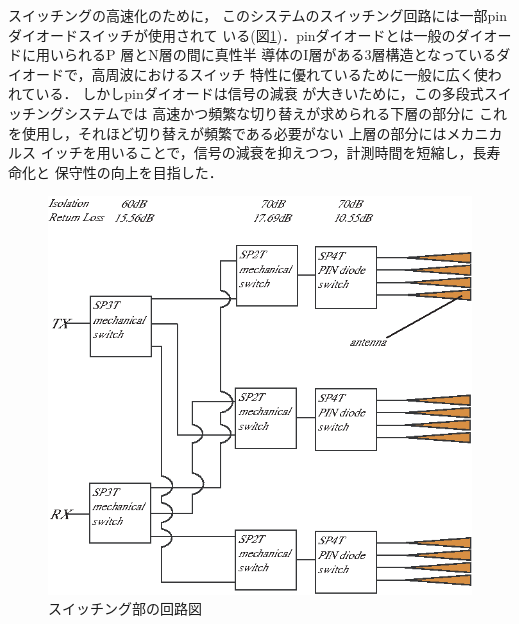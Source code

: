 ﻿\documentclass[12pt,oneside]{jsbook}
\begin{document}
スイッチングの高速化のために，
このシステムのスイッチング回路には一部pinダイオードスイッチが使用されて
いる(図\ref{scircuit})．pinダイオードとは一般のダイオードに用いられるP
層とN層の間に真性半
導体のI層がある3層構造となっているダイオードで，高周波におけるスイッチ
特性に優れているために一般に広く使われている．
しかしpinダイオードは信号の減衰
が大きいために，この多段式スイッチングシステムでは
高速かつ頻繁な切り替えが求められる下層の部分に
これを使用し，それほど切り替えが頻繁である必要がない
上層の部分にはメカニカルス
イッチを用いることで，信号の減衰を抑えつつ，計測時間を短縮し，長寿命化と
保守性の向上を目指した．

\begin{figure}[btp]
\begin{center}
\includegraphics[width =\hsize ]{switch-circuit.eps}
\caption{スイッチング部の回路図}
\label{scircuit}
 \end{center}
\end{figure}
\end{document}
